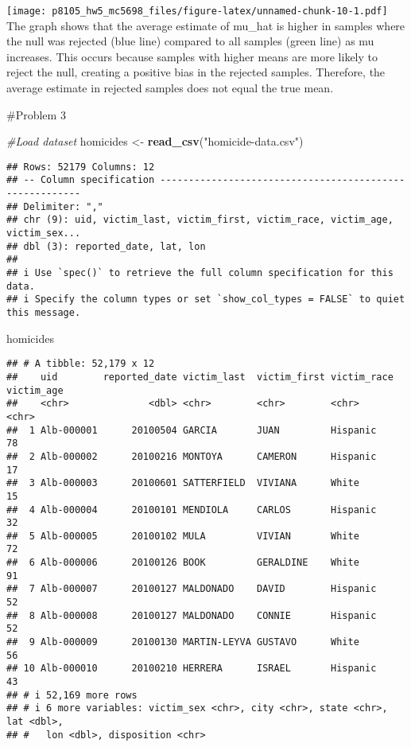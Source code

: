 \documentclass[
]{article}
\newenvironment{Shaded}{\begin{snugshade}}{\end{snugshade}}
\newcommand{\CommentTok}[1]{\textcolor[rgb]{0.56,0.35,0.01}{\textit{#1}}}
\newcommand{\FunctionTok}[1]{\textcolor[rgb]{0.13,0.29,0.53}{\textbf{#1}}}
\newcommand{\NormalTok}[1]{#1}
\newcommand{\OtherTok}[1]{\textcolor[rgb]{0.56,0.35,0.01}{#1}}
\newcommand{\StringTok}[1]{\textcolor[rgb]{0.31,0.60,0.02}{#1}}
\begin{document}
\texttt{[image: p8105\_hw5\_mc5698\_files/figure-latex/unnamed-chunk-10-1.pdf]}
The graph shows that the average estimate of mu\_hat is higher in
samples where the null was rejected (blue line) compared to all samples
(green line) as mu increases. This occurs because samples with higher
means are more likely to reject the null, creating a positive bias in
the rejected samples. Therefore, the average estimate in rejected
samples does not equal the true mean.

\#Problem 3

\begin{Shaded}
\begin{Highlighting}[]
\CommentTok{\#Load dataset}
\NormalTok{homicides }\OtherTok{\textless{}{-}} \FunctionTok{read\_csv}\NormalTok{(}\StringTok{"homicide{-}data.csv"}\NormalTok{)}
\end{Highlighting}
\end{Shaded}

\begin{verbatim}
## Rows: 52179 Columns: 12
## -- Column specification --------------------------------------------------------
## Delimiter: ","
## chr (9): uid, victim_last, victim_first, victim_race, victim_age, victim_sex...
## dbl (3): reported_date, lat, lon
## 
## i Use `spec()` to retrieve the full column specification for this data.
## i Specify the column types or set `show_col_types = FALSE` to quiet this message.
\end{verbatim}

\begin{Shaded}
\begin{Highlighting}[]
\NormalTok{homicides}
\end{Highlighting}
\end{Shaded}

\begin{verbatim}
## # A tibble: 52,179 x 12
##    uid        reported_date victim_last  victim_first victim_race victim_age
##    <chr>              <dbl> <chr>        <chr>        <chr>       <chr>     
##  1 Alb-000001      20100504 GARCIA       JUAN         Hispanic    78        
##  2 Alb-000002      20100216 MONTOYA      CAMERON      Hispanic    17        
##  3 Alb-000003      20100601 SATTERFIELD  VIVIANA      White       15        
##  4 Alb-000004      20100101 MENDIOLA     CARLOS       Hispanic    32        
##  5 Alb-000005      20100102 MULA         VIVIAN       White       72        
##  6 Alb-000006      20100126 BOOK         GERALDINE    White       91        
##  7 Alb-000007      20100127 MALDONADO    DAVID        Hispanic    52        
##  8 Alb-000008      20100127 MALDONADO    CONNIE       Hispanic    52        
##  9 Alb-000009      20100130 MARTIN-LEYVA GUSTAVO      White       56        
## 10 Alb-000010      20100210 HERRERA      ISRAEL       Hispanic    43        
## # i 52,169 more rows
## # i 6 more variables: victim_sex <chr>, city <chr>, state <chr>, lat <dbl>,
## #   lon <dbl>, disposition <chr>
\end{verbatim}
\end{document}
